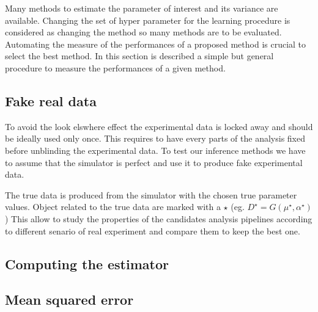 
Many methods to estimate the parameter of interest and its variance are available.
Changing the set of hyper parameter for the learning procedure is considered as changing the method so many methods are to be evaluated.
Automating the measure of the performances of a proposed method is crucial to select the best method.
In this section is described a simple but general procedure to measure the performances of a given method.






\subsection{Fake real data} %
\label{sub:fake_real_data}


To avoid the look elswhere effect the experimental data is locked away and should be ideally used only once.
This requires to have every parts of the analysis fixed before unblinding the experimental data.
To test our inference methods we have to assume that the simulator is perfect and use it to produce fake experimental data.

The true data is produced from the simulator with the chosen true parameter values.
Object related to the true data are marked with a $\star$ (eg. $D^\star = G(\mu^\star, \alpha^\star) $ )
This allow to study the properties of the candidates analysis pipelines according to different senario of real experiment and compare them to keep the best one.






\subsection{Computing the estimator} %
\label{sub:computing_the_estimator}











\subsection{Mean squared error} %
\label{sub:mean_squared_error}


